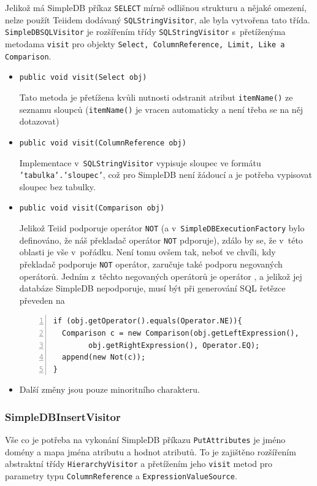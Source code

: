 \documentclass[oneside,12pt,final]{fithesis2}
\begin{document}
Jelikož má SimpleDB příkaz \texttt{SELECT} mírně odlišnou strukturu a nějaké omezení, nelze použít Teiidem dodávaný \texttt{SQLStringVisitor}, ale byla vytvořena tato třída.
\texttt{SimpleDBSQLVisitor} je rozšířením třídy \texttt{SQLStringVisitor} s~přetíženýma metodama \texttt{visit} pro objekty \texttt{Select, ColumnReference, Limit, Like a Comparison}.
\begin{itemize}
 \item \texttt{public void visit(Select obj)}
 
 Tato metoda je přetížena kvůli nutnosti odstranit atribut \texttt{itemName()} ze seznamu sloupců (\texttt{itemName()} je vracen automaticky a není třeba se na něj dotazovat)
 \item \texttt{public void visit(ColumnReference obj)}
 
 Implementace v~\texttt{SQLStringVisitor} vypisuje sloupec ve formátu \texttt{'tabulka'\allowbreak.'sloupec'}, což pro SimpleDB není žádoucí a je potřeba vypisovat sloupec bez tabulky.
 
 \item \texttt{public void visit(Comparison obj)}
 
 Jelikož Teiid podporuje operátor \texttt{NOT} (a v~\texttt{SimpleDBExecution\allowbreak Factory} bylo definováno, že náš překladač operátor \texttt{NOT} pdporuje), zdálo by se, že v~této oblasti je vše v~pořádku. Není tomu ovšem tak, neboť ve chvíli, kdy překladač podporuje \texttt{NOT} operátor, zaručuje také podporu negovaných operátorů. Jedním z~těchto negovaných operátorů je operátor , a jelikož jej databáze SimpleDB nepodporuje, musí být při generování SQL řetězce převeden na 
 \begin{Verbatim}[fontsize=\small,numbers=left]
if (obj.getOperator().equals(Operator.NE)){
  Comparison c = new Comparison(obj.getLeftExpression(), 
		obj.getRightExpression(), Operator.EQ);
  append(new Not(c));
}
 \end{Verbatim}
\item Další změny jsou pouze minoritního charakteru.
\end{itemize}

\subsubsection*{SimpleDBInsertVisitor}
Vše co je potřeba na vykonání SimpleDB příkazu \texttt{PutAttributes} je jméno domény a mapa jména atributu a hodnot atributů. To je zajištěno rozšířením abstraktní třídy \texttt{HierarchyVisitor} a přetížením jeho \texttt{visit} metod pro parametry typu \texttt{ColumnReference} a \texttt{ExpressionValueSource}.
\end{document}
